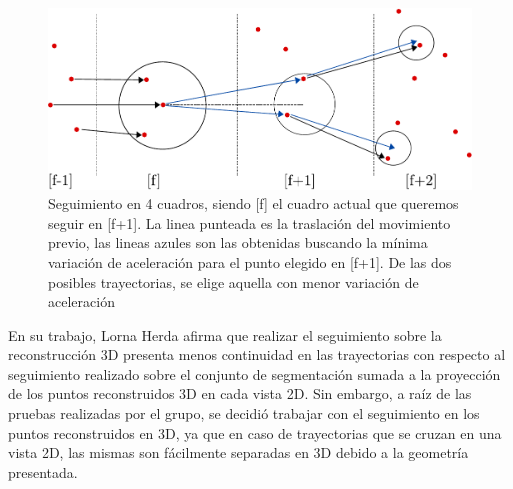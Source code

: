 \begin{figure}[ht!]
\begin{center}
\includegraphics[scale=0.8]{img/Tracking/tracking-eps-converted-to.pdf}
\end{center}
\caption{Seguimiento en 4 cuadros, siendo [f] el cuadro actual que queremos seguir en [f+1]. La linea punteada es la traslación del movimiento previo, las lineas azules son las obtenidas buscando la mínima variación de aceleración para el punto elegido en [f+1]. De las dos posibles trayectorias, se elige aquella con menor variación de aceleración}
\label{herda_00}
\end{figure}

En su trabajo, Lorna Herda afirma que realizar el seguimiento sobre la reconstrucción 3D presenta menos continuidad en las trayectorias con respecto al seguimiento realizado sobre el conjunto de segmentación sumada a la proyección de los puntos reconstruidos 3D en cada vista 2D. Sin embargo, a raíz de las pruebas realizadas por el grupo, se decidió trabajar con el seguimiento en los puntos reconstruidos en 3D, ya que en caso de trayectorias que se cruzan en una vista 2D, las mismas son fácilmente separadas en 3D debido a la geometría presentada.
\\ 

